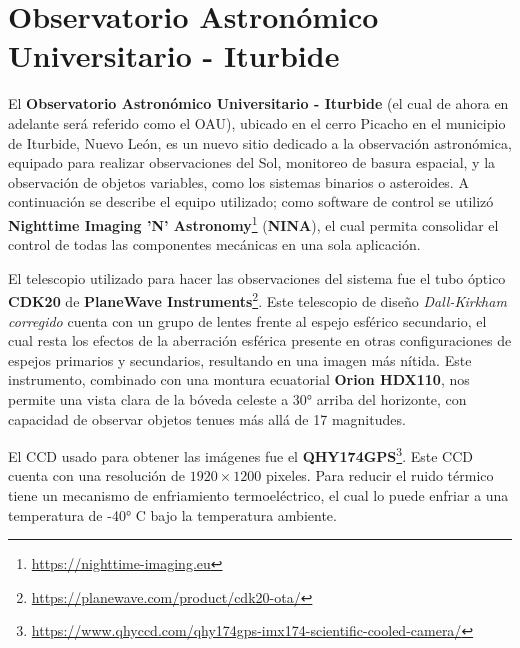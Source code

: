 \section{Observatorio Astronómico Universitario - Iturbide}

El \textbf{Observatorio Astronómico Universitario - Iturbide} (el cual de ahora
en adelante será referido como el OAU), ubicado en el cerro Picacho en el
municipio de Iturbide, Nuevo León, es un nuevo sitio dedicado a la observación
astronómica, equipado para realizar observaciones del Sol, monitoreo de basura
espacial, y la observación de objetos variables, como los sistemas binarios o
asteroides. A continuación se describe el equipo utilizado; como software de
control se utilizó \textbf{Nighttime Imaging 'N'
Astronomy}\footnote{\url{https://nighttime-imaging.eu}} (\textbf{NINA}), el cual
permita consolidar el control de todas las componentes mecánicas en una sola
aplicación. 

El telescopio utilizado para hacer las observaciones del sistema fue el tubo
óptico \textbf{CDK20} de \textbf{PlaneWave
Instruments}\footnote{\url{https://planewave.com/product/cdk20-ota/}}. Este
telescopio de diseño \textit{Dall-Kirkham corregido} cuenta con un grupo de
lentes frente al espejo esférico secundario, el cual resta los efectos de la
aberración esférica presente en otras configuraciones de espejos primarios y
secundarios, resultando en una imagen más nítida. Este instrumento, combinado
con una montura ecuatorial \textbf{Orion HDX110}, nos permite una vista clara de
la bóveda celeste a \ang{30} arriba del horizonte, con capacidad de observar
objetos tenues más allá de 17 magnitudes.

El CCD usado para obtener las imágenes fue el
\textbf{QHY174GPS}\footnote{\url{https://www.qhyccd.com/qhy174gps-imx174-scientific-cooled-camera/}}.
Este CCD cuenta con una resolución de $1920 \times 1200$ pixeles. Para reducir
el ruido térmico tiene un mecanismo de enfriamiento termoeléctrico, el cual lo
puede enfriar a una temperatura de -\ang{40} C bajo la temperatura ambiente. 